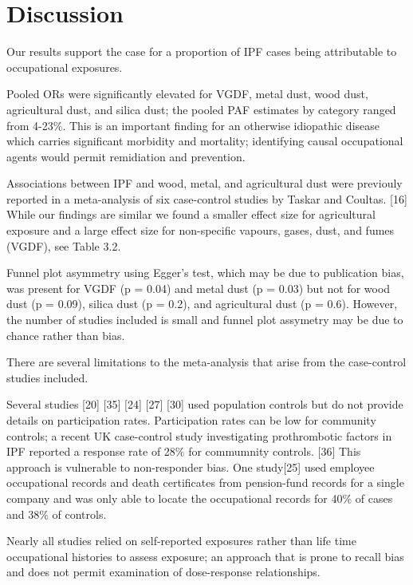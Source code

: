 \documentclass[12pt,a4paper,]{report}
\begin{document}
\hypertarget{discussion}{%
\chapter{Discussion}\label{discussion}}

Our results support the case for a proportion of IPF cases being
attributable to occupational exposures.

Pooled ORs were significantly elevated for VGDF, metal dust, wood dust,
agricultural dust, and silica dust; the pooled PAF estimates by category
ranged from 4-23\%. This is an important finding for an otherwise
idiopathic disease which carries significant morbidity and mortality;
identifying causal occupational agents would permit remidiation and
prevention.

Associations between IPF and wood, metal, and agricultural dust were
previouly reported in a meta-analysis of six case-control studies by
Taskar and Coultas. {[}16{]} While our findings are similar we found a
smaller effect size for agricultural exposure and a large effect size
for non-specific vapours, gases, dust, and fumes (VGDF), see Table 3.2.

Funnel plot asymmetry using Egger's test, which may be due to
publication bias, was present for VGDF (p = 0.04) and metal dust (p =
0.03) but not for wood dust (p = 0.09), silica dust (p = 0.2), and
agricultural dust (p = 0.6). However, the number of studies included is
small and funnel plot assymetry may be due to chance rather than bias.

There are several limitations to the meta-analysis that arise from the
case-control studies included.

Several studies {[}20{]} {[}35{]} {[}24{]} {[}27{]} {[}30{]} used
population controls but do not provide details on participation rates.
Participation rates can be low for community controls; a recent UK
case-control study investigating prothrombotic factors in IPF reported a
response rate of 28\% for commumnity controls. {[}36{]} This approach is
vulnerable to non-responder bias. One study{[}25{]} used employee
occupational records and death certificates from pension-fund records
for a single company and was only able to locate the occupational
records for 40\% of cases and 38\% of controls.

Nearly all studies relied on self-reported exposures rather than life
time occupational histories to assess exposure; an approach that is
prone to recall bias and does not permit examination of dose-response
relationships.
\end{document}
